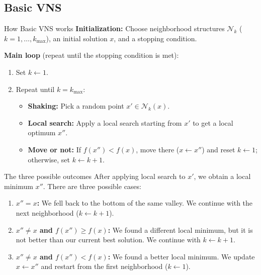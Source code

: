 \documentclass{beamer}
\begin{document}
\subsection{Basic VNS}
\begin{frame}{How Basic VNS works}
\textbf{Initialization:} Choose neighborhood structures $\mathcal{N}_k$ ($k = 1, \dots, k_{\max}$), an initial solution $x$, and a stopping condition.

\vspace{0.2cm}
\textbf{Main loop} (repeat until the stopping condition is met):
\begin{enumerate}
\item Set $k \leftarrow 1$.
\item Repeat until $k = k_{\max}$:
    \begin{itemize}
    \item \textbf{Shaking:} Pick a random point $x' \in \mathcal{N}_k(x)$.
    \item \textbf{Local search:} Apply a local search starting from $x'$ to get a local optimum $x''$.
    \item \textbf{Move or not:} If $f(x'') < f(x)$, move there ($x \leftarrow x''$) and reset $k \leftarrow 1$; otherwise, set $k \leftarrow k + 1$.
    \end{itemize}
\end{enumerate}
\end{frame}

\begin{frame}{The three possible outcomes}
\quad After applying local search to $x'$, we obtain a local minimum $x''$. There are three possible cases:

\vspace{0.3cm}
\begin{enumerate}
\item \textbf{$x'' = x$:} We fell back to the bottom of the same valley. We continue with the next neighborhood ($k \leftarrow k + 1$).
\vspace{0.2cm}
\item \textbf{$x'' \neq x$ and $f(x'') \geq f(x)$:} We found a different local minimum, but it is not better than our current best solution. We continue with $k \leftarrow k + 1$.
\vspace{0.2cm}
\item \textbf{$x'' \neq x$ and $f(x'') < f(x)$:} We found a better local minimum. We update $x \leftarrow x''$ and restart from the first neighborhood ($k \leftarrow 1$).
\end{enumerate}
\end{frame}
\end{document}
